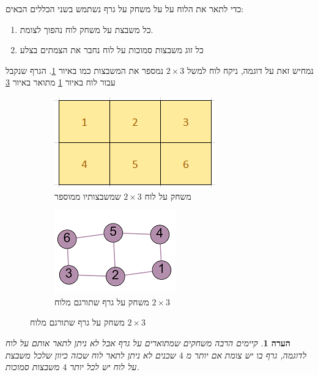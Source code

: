 \documentclass[12pt,leqno]{article}
\newtheorem{comm}{הערה}[section]
\begin{document}
כדי לתאר את הלוח על על משחק על גרף נשתמש בשני הכללים הבאים:
\begin{enumerate}
    \item 
    כל משבצת על משחק לוח נהפוך לצומת.
    \item 
    כל זוג משבצות סמוכות על לוח נחבר את הצמתים בצלע
\end{enumerate}

נמחיש זאת על דוגמה, ניקח לוח למשל
$2 \times 3$
נמספר את המשבצות כמו באיור
\ref{2x3_board}.
הגרף שנקבל עבור לוח באיור
\ref{2x3_board}
מתואר באיור
\ref{2x3_graph}

\begin{figure}[ht]
    \caption{
        דוגמה
        למשחק על לוח שתורגם למשחק על גרף
        }
    \begin{subfigure}{.5\textwidth}
        \caption{
            משחק על לוח
            $2 \times 3$
            שמשבצותיו
            ממוספר
        }
        \label{2x3_board}
        \centering
        \includegraphics[scale=0.9]{images/2x3_board.PNG}
    \end{subfigure}%
    \begin{subfigure}{.5\textwidth}
        \caption{
            משחק על גרף
            שתורגם מלוח
            $2 \times 3$
        }
        \centering
        \label{2x3_graph}
        \includegraphics[scale=1]{images/2x3_graph.png}
    \end{subfigure}%
\end{figure}


\begin{comm}
    קיימים הרבה משחקים שמתוארים על גרף אבל לא ניתן לתאר אותם על לוח
    לדוגמה,
    גרף בו יש צומת אם יותר מ
    $4$
    שכנים לא ניתן לתאר לוח שכזה כיוון שלכל משבצת על לוח
    יש לכל יותר 
    $4$
    משבצות סמוכות.
\end{comm}
\end{document}
